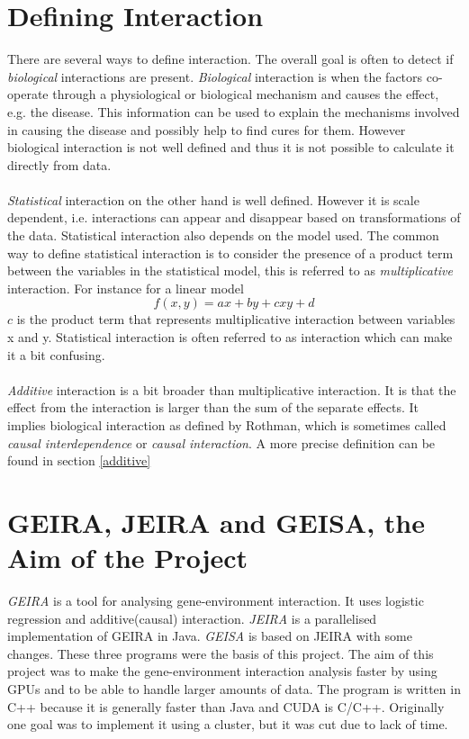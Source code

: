 \documentclass[10pt,a4paper]{report}
\begin{document}
\newpage
\section{Defining Interaction}
\label{interaction}
There are several ways to define interaction. The overall goal is often to detect if \emph{biological} interactions are present. \emph{Biological} interaction is when the factors co-operate through a physiological or biological mechanism and causes the effect, e.g. the disease. This information can be used to explain the mechanisms involved in causing the disease and possibly help to find cures for them. However biological interaction is not well defined and thus it is not possible to calculate it directly from data.\cite{rothman1998modern,rothman2002intro_epidemiology}\\
\\
\emph{Statistical} interaction on the other hand is well defined. However it is scale dependent, i.e. interactions can appear and disappear based on transformations of the data. Statistical interaction also depends on the model used. The common way to define statistical interaction is to consider the presence of a product term between the variables in the statistical model, this is referred to as \emph{multiplicative} interaction. For instance for a linear model
\begin{equation}
f(x,y)=ax+by+cxy+d
\end{equation}
$c$ is the product term that represents multiplicative interaction between variables x and y. Statistical interaction is often referred to as interaction which can make it a bit confusing.\cite{geira,rothman1998modern}\\
\\
\emph{Additive} interaction is a bit broader than multiplicative interaction. It is that the effect from the interaction is larger than the sum of the separate effects. It implies biological interaction as defined by Rothman\cite{rothman1998modern}, which is sometimes called \emph{causal interdependence} or \emph{causal interaction}. A more precise definition can be found in section \ref{additive}

\section{GEIRA, JEIRA and GEISA, the Aim of the Project}
\label{jeira}
\emph{GEIRA} is a tool for analysing gene-environment interaction. It uses logistic regression and additive(causal) interaction\cite{geira}. \emph{JEIRA} is a parallelised implementation of GEIRA in Java\cite{uvehag_master_thesis}. \emph{GEISA} is based on JEIRA with some changes\cite{geisa}. These three programs were the basis of this project. The aim of this project was to make the gene-environment interaction analysis faster by using GPUs and to be able to handle larger amounts of data. The program is written in C++ because it is generally faster than Java and CUDA is C/C++. Originally one goal was to implement it using a cluster, but it was cut due to lack of time.
\end{document}
